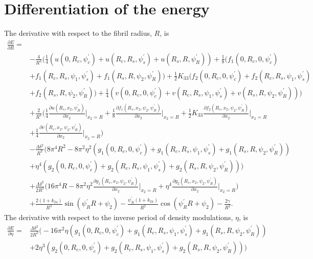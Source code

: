 \documentclass[12pt]{article}
\begin{document}
\section{Differentiation of the energy}
The derivative with respect to the fibril radius, $R$, is
\begin{align}
\frac{\partial E}{\partial R}=&\nonumber\\
&-\frac{4}{R^3}\bigg(\frac{1}{4}(u(0,R_c,\psi_c^{\prime})+u(R_c,R_s,\psi_s^{\prime})+u(R_s,R,\psi_R^{\prime}))+\frac{1}{8}(f_1(0,R_c,0,\psi_c^{\prime})\nonumber\\
&+f_1(R_c,R_s,\psi_1,\psi_s^{\prime})+f_1(R_s,R,\psi_2,\psi_R^{\prime}))+\frac{1}{2}K_{33}(f_2(0,R_c,0,\psi_c^{\prime})+f_2(R_c,R_s,\psi_1,\psi_s^{\prime})\nonumber\\
&+f_2(R_s,R,\psi_2,\psi_R^{\prime}))+\frac{1}{4}(v(0,R_c,0,\psi_c^{\prime})+v(R_c,R_s,\psi_1,\psi_s^{\prime})+v(R_s,R,\psi_2,\psi_R^{\prime}))\bigg)\nonumber\\
&+\frac{2}{R^2}\bigg(\frac{1}{4}\frac{\partial u(R_s,x_2,\psi_R^{\prime})}{\partial x_2}\bigg|_{x_2=R}+\frac{1}{8}\frac{\partial f_1(R_s,x_2,\psi_2,\psi_R^{\prime})}{\partial x_2}\bigg|_{x_2=R}+\frac{1}{2}K_{33}\frac{\partial f_2(R_s,x_2,\psi_2,\psi_R^{\prime})}{\partial x_2}\bigg|_{x_2=R}\nonumber\\
&+\frac{1}{4}\frac{\partial v(R_s,x_2,\psi_2,\psi_R^{\prime})}{\partial x_2}\bigg|_{x_2=R}\bigg)\nonumber\\
&-\frac{\Lambda\delta^2}{R^3}\big(8\pi^4R^2-8\pi^2\eta^2(g_1(0,R_c,0,\psi_c^{\prime})+g_1(R_c,R_s,\psi_1,\psi_s^{\prime})+g_1(R_s,R,\psi_2,\psi_R^{\prime}))\nonumber\\
&+\eta^4(g_2(0,R_c,0,\psi_c^{\prime})+g_2(R_c,R_s,\psi_1,\psi_s^{\prime})+g_2(R_s,R,\psi_2,\psi_R^{\prime}))\big)\nonumber\\
&+\frac{\Lambda\delta^2}{2R^2}\bigg(16\pi^4R-8\pi^2\eta^2\frac{\partial g_1(R_s,x_2,\psi_2,\psi_R^{\prime})}{\partial x_2}\bigg|_{x_2=R}+\eta^4\frac{\partial g_2(R_s,x_2,\psi_2,\psi_R^{\prime})}{\partial x_2}\bigg|_{x_2=R}\bigg)\nonumber\\
&+\frac{2(1+k_{24})}{R^3}\sin(\psi_R^{\prime}R+\psi_2)-\frac{\psi_R^{\prime}(1+k_{24})}{R^2}\cos(\psi_R^{\prime}R+\psi_2)-\frac{2\gamma}{R^2}.\label{eq:dEdR}
\end{align}
The derivative with respect to the inverse period of density modulations, $\eta$, is
\begin{align}
\frac{\partial E}{\partial \eta}=&
\frac{\Lambda\delta^2}{2R^2}\big(-16\pi^2\eta(g_1(0,R_c,0,\psi_c^{\prime})+g_1(R_c,R_s,\psi_1,\psi_s^{\prime})+g_1(R_s,R,\psi_2,\psi_R^{\prime}))\nonumber\\
&+2\eta^3(g_2(0,R_c,0,\psi_c^{\prime})+g_2(R_c,R_s,\psi_1,\psi_s^{\prime})+g_2(R_s,R,\psi_2,\psi_R^{\prime}))\big)\label{eq:dEdeta}
\end{align}
\end{document}
